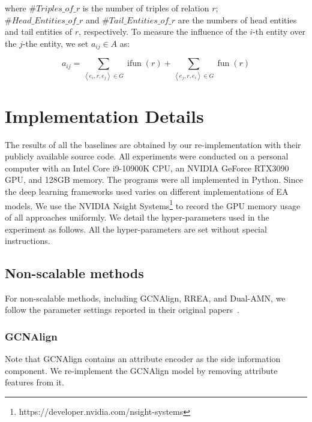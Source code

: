 where $\#Triples\_of\_r$ is the number of triples of relation $r$; \\$\#Head\_Entities\_of\_r$ and $\#Tail\_Entities\_of\_r$ are the numbers of head entities and tail entities of $r$, respectively. To measure the influence of the $i$-th entity over the $j$-the entity, we set $a_{i j} \in A$ as:

\begin{equation}
a_{i j}=\sum_{\left\langle e_{i}, r, e_{j}\right\rangle \in G} \operatorname { ifun }(r)+\sum_{\left\langle e_{j}, r, e_{i}\right\rangle \in G}\operatorname{fun}(r)
\end{equation}




\section{Implementation Details}
\label{app:details}
The results of all the baselines are obtained by our re-implementation with their publicly available source code. 
All experiments were conducted on a personal computer with an Intel Core i9-10900K CPU, an NVIDIA GeForce RTX3090 GPU, and 128GB memory. The programs were all implemented in Python. 
Since the deep learning frameworks used varies on different implementations of EA models. 
We use the NVIDIA Nsight Systems\footnote{https://developer.nvidia.com/nsight-systems} to record the GPU memory usage of all approaches uniformly.
We detail the hyper-parameters used in the experiment as follows. All the hyper-parameters are set without special instructions.

\subsection{Non-scalable methods} For non-scalable methods, including GCNAlign, RREA, and Dual-AMN, we follow the parameter settings reported in their original papers~\cite{GCN-Align18,RREA20, DualAMN21}. 

\subsubsection{GCNAlign}
Note that GCNAlign contains an attribute encoder as the side information component.
We re-implement the GCNAlign model by removing attribute features from it.

